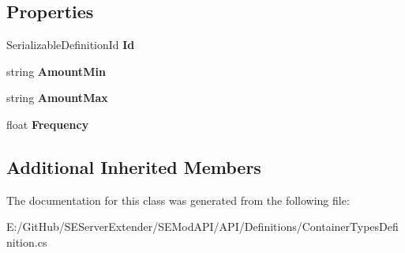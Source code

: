 \subsection*{Properties}
\begin{DoxyCompactItemize}
\item 
\hypertarget{class_s_e_mod_a_p_i_1_1_a_p_i_1_1_definitions_1_1_container_type_item_a878c752a6bf3a4f3d00b87c6002479c1}{}Serializable\+Definition\+Id {\bfseries Id}\label{class_s_e_mod_a_p_i_1_1_a_p_i_1_1_definitions_1_1_container_type_item_a878c752a6bf3a4f3d00b87c6002479c1}

\item 
\hypertarget{class_s_e_mod_a_p_i_1_1_a_p_i_1_1_definitions_1_1_container_type_item_a17c6119ccfe6236118ee587ea021d705}{}string {\bfseries Amount\+Min}\label{class_s_e_mod_a_p_i_1_1_a_p_i_1_1_definitions_1_1_container_type_item_a17c6119ccfe6236118ee587ea021d705}

\item 
\hypertarget{class_s_e_mod_a_p_i_1_1_a_p_i_1_1_definitions_1_1_container_type_item_a5480f5671292935181fd71ef2aa05b26}{}string {\bfseries Amount\+Max}\label{class_s_e_mod_a_p_i_1_1_a_p_i_1_1_definitions_1_1_container_type_item_a5480f5671292935181fd71ef2aa05b26}

\item 
\hypertarget{class_s_e_mod_a_p_i_1_1_a_p_i_1_1_definitions_1_1_container_type_item_ad568fa85798fa4f93f4339a5be044b08}{}float {\bfseries Frequency}\label{class_s_e_mod_a_p_i_1_1_a_p_i_1_1_definitions_1_1_container_type_item_ad568fa85798fa4f93f4339a5be044b08}

\end{DoxyCompactItemize}
\subsection*{Additional Inherited Members}


The documentation for this class was generated from the following file\+:\begin{DoxyCompactItemize}
\item 
E\+:/\+Git\+Hub/\+S\+E\+Server\+Extender/\+S\+E\+Mod\+A\+P\+I/\+A\+P\+I/\+Definitions/Container\+Types\+Definition.\+cs\end{DoxyCompactItemize}
